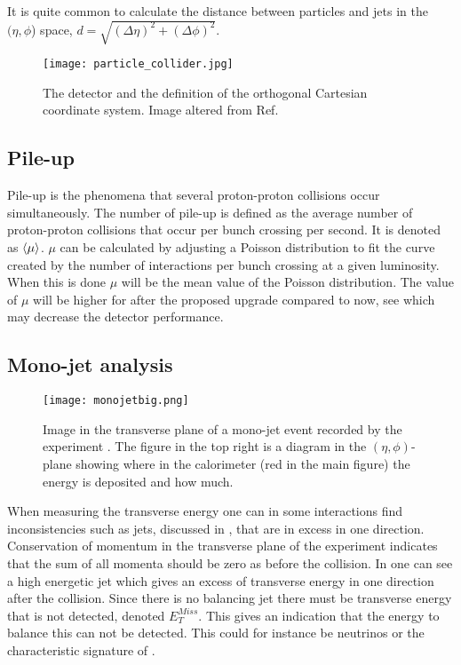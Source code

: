 It is quite common to calculate the distance between particles and jets in the $(\eta,\phi$) space, $d=\sqrt{(\Delta \eta)^2 + (\Delta \phi)^2}$. 

\begin{figure}[ht]
\begin{center}
\texttt{[image: particle\_collider.jpg]}
\caption{The \abbrATLAS detector and the definition of the orthogonal Cartesian coordinate system. Image altered from Ref. \citep{coordimage}}
\label{fig:coordinatesystem}
\end{center}
\end{figure}

\subsection{Pile-up}\label{sec:eo:subsec:pile}

Pile-up is the phenomena that several proton-proton collisions occur simultaneously. The number of pile-up is defined as the average number of proton-proton collisions that occur per bunch crossing per second. It is denoted as $\left<\mu\right>$. $\mu$ can be calculated by adjusting a Poisson distribution to fit the curve created by the number of interactions per bunch crossing at a given luminosity. When this is done $\mu$ will be the mean value of the Poisson distribution. The value of $\mu$ will be higher for after the proposed upgrade compared to now, see  which may decrease the detector performance.

\subsection{Mono-jet analysis}\label{sec:eo:subsec:mjet}

\begin{figure}[ht]
\texttt{[image: monojetbig.png]}
\caption{Image in the transverse plane of a mono-jet event recorded by the \abbrATLAS experiment \citep{monojet}. The figure in the top right is a diagram in the $(\eta,\phi)$-plane showing where in the calorimeter (red in the main figure) the energy is deposited and how much.}
\label{fig:monojet}
\end{figure}

When measuring the transverse energy one can in some interactions find inconsistencies such as jets, discussed in , that are in excess in one direction. Conservation of momentum in the transverse plane of the experiment indicates that the sum of all momenta should be zero as before the collision. In  one can see a high energetic jet which gives an excess of transverse energy in one direction after the collision. Since there is no balancing jet there must be transverse energy that is not detected, denoted $E_T^{Miss}$. This gives an indication that the energy to balance this can not be detected. This could for instance be neutrinos or the characteristic signature of \abbrWIMPS .

